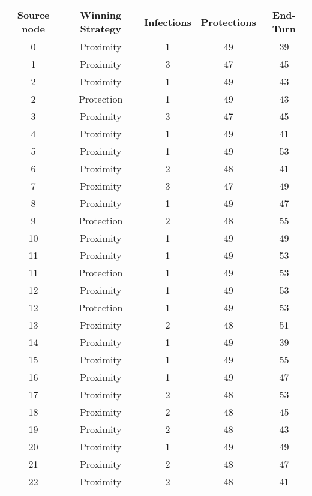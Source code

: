 \documentclass[results.tex]{subfiles}
\begin{document}
\begin{center}
  \begin{tabular}{| c || c | c | c | c |}
    \hline
    {\bfseries Source node} & {\bfseries Winning Strategy} & {\bfseries Infections} & {\bfseries Protections} & {\bfseries End-Turn} \\  %
    \hline\hline
    0 & Proximity & 1 & 49 & 39 \\ 
    \hline
    1 & Proximity & 3 & 47 & 45 \\ 
    \hline
    2 & Proximity & 1 & 49 & 43 \\ 
    \hline
    2 & Protection & 1 & 49 & 43 \\ 
    \hline
    3 & Proximity & 3 & 47 & 45 \\ 
    \hline
    4 & Proximity & 1 & 49 & 41 \\ 
    \hline
    5 & Proximity & 1 & 49 & 53 \\ 
    \hline
    6 & Proximity & 2 & 48 & 41 \\ 
    \hline
    7 & Proximity & 3 & 47 & 49 \\ 
    \hline
    8 & Proximity & 1 & 49 & 47 \\ 
    \hline
    9 & Protection & 2 & 48 & 55 \\ 
    \hline
    10 & Proximity & 1 & 49 & 49 \\ 
    \hline
    11 & Proximity & 1 & 49 & 53 \\ 
    \hline
    11 & Protection & 1 & 49 & 53 \\ 
    \hline
    12 & Proximity & 1 & 49 & 53 \\ 
    \hline
    12 & Protection & 1 & 49 & 53 \\ 
    \hline
    13 & Proximity & 2 & 48 & 51 \\ 
    \hline
    14 & Proximity & 1 & 49 & 39 \\ 
    \hline
    15 & Proximity & 1 & 49 & 55 \\ 
    \hline
    16 & Proximity & 1 & 49 & 47 \\ 
    \hline
    17 & Proximity & 2 & 48 & 53 \\ 
    \hline
    18 & Proximity & 2 & 48 & 45 \\ 
    \hline
    19 & Proximity & 2 & 48 & 43 \\ 
    \hline
    20 & Proximity & 1 & 49 & 49 \\ 
    \hline
    21 & Proximity & 2 & 48 & 47 \\ 
    \hline
    22 & Proximity & 2 & 48 & 41 \\ 

\end{tabular}
\end{center}
\end{document}
